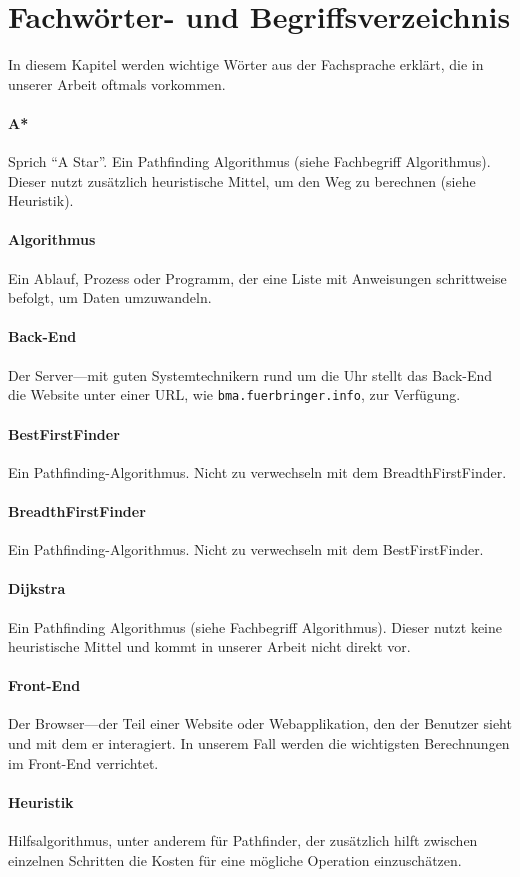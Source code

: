 \section*{Fachwörter- und Begriffsverzeichnis}
In diesem Kapitel werden wichtige Wörter aus der Fachsprache erklärt, die in unserer Arbeit oftmals vorkommen.
\paragraph{A*} Sprich ``A Star''. Ein Pathfinding Algorithmus (siehe Fachbegriff Algorithmus). Dieser nutzt zusätzlich heuristische Mittel, um den Weg zu berechnen (siehe Heuristik).
\paragraph{Algorithmus} Ein Ablauf, Prozess oder Programm, der eine Liste mit Anweisungen schrittweise befolgt, um Daten umzuwandeln.
\paragraph{Back-End} Der Server---mit guten Systemtechnikern rund um die Uhr stellt das Back-End die Website unter einer URL, wie \texttt{bma.fuerbringer.info}, zur Verfügung.
\paragraph{BestFirstFinder} Ein Pathfinding-Algorithmus. Nicht zu verwechseln mit dem BreadthFirstFinder.
\paragraph{BreadthFirstFinder} Ein Pathfinding-Algorithmus. Nicht zu verwechseln mit dem BestFirstFinder.
\paragraph{Dijkstra} Ein Pathfinding Algorithmus (siehe Fachbegriff Algorithmus). Dieser nutzt keine heuristische Mittel und kommt in unserer Arbeit nicht direkt vor.
\paragraph{Front-End} Der Browser---der Teil einer Website oder Webapplikation, den der Benutzer sieht und mit dem er interagiert. In unserem Fall werden die wichtigsten Berechnungen im Front-End verrichtet.
\paragraph{Heuristik} Hilfsalgorithmus, unter anderem für Pathfinder, der zusätzlich hilft zwischen einzelnen Schritten die Kosten für eine mögliche Operation einzuschätzen.
